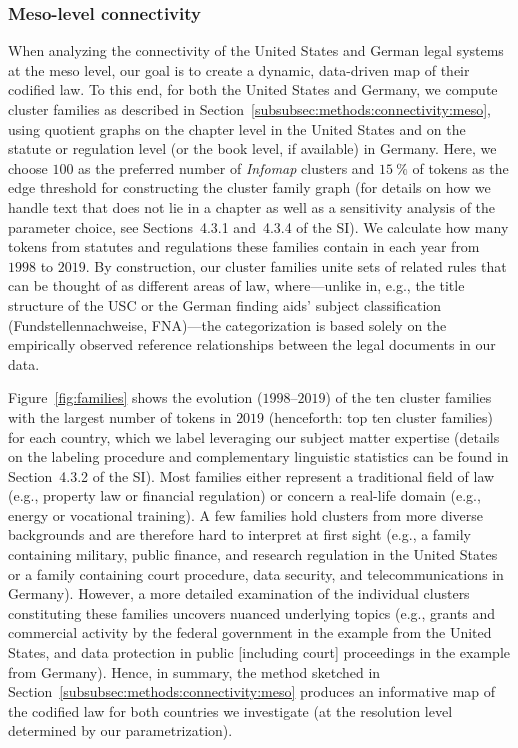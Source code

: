 \documentclass[utf8,sort&compress,table,hidelinks]{frontiersFPHY} %
\newcommand{\thesi}{SI\xspace}
\begin{document}
\vspace*{12pt}
\subsubsection{Meso-level connectivity}
\label{subsubsec:results:connectivity:meso}

When analyzing the connectivity of the United States and German legal systems at the meso level, our goal is to create a dynamic, data-driven map of their codified law.
To this end, for both the United States and Germany, we compute cluster families as described in Section~\ref{subsubsec:methods:connectivity:meso}, 
using quotient graphs on the chapter level in the United States and on the statute or regulation level (or the book level, if available) in Germany. 
Here, we choose $100$ as the preferred number of \emph{Infomap} clusters and $15~\%$ of tokens as the edge threshold for constructing the cluster family graph (for details on how we handle text that does not lie in a chapter as well as a sensitivity analysis of the parameter choice, see Sections~4.3.1 and~4.3.4 of the \thesi). 
We calculate how many tokens from statutes and regulations these families contain in each year from $1998$ to $2019$.
By construction, our cluster families unite sets of related rules that can be thought of as different areas of law, where---unlike in, e.g., the title structure of the USC or the German finding aids' subject classification (Fundstellennachweise, FNA)---the categorization is based solely on the empirically observed reference relationships between the legal documents in our data.

Figure~\ref{fig:families} shows the evolution ($1998$--$2019$) of the ten cluster families with the largest number of tokens in $2019$ (henceforth: top ten cluster families) for each country, which we label leveraging our subject matter expertise (details on the labeling procedure and complementary linguistic statistics can be found in Section~4.3.2 of the \thesi).
Most families either represent a traditional field of law (e.g., property law or financial regulation) or concern a real-life domain (e.g., energy or vocational training).
A few families hold clusters from more diverse backgrounds and are therefore hard to interpret at first sight (e.g., a family containing military, public finance, and research regulation in the United States or a family containing court procedure, data security, and telecommunications in Germany).
However, a more detailed examination of the individual clusters constituting these families uncovers nuanced underlying topics (e.g., grants and commercial activity by the federal government in the example from the United States, and data protection in public [including court] proceedings in the example from Germany).
Hence, in summary, the method sketched in Section~\ref{subsubsec:methods:connectivity:meso} produces an informative map of the codified law for both countries we investigate (at the resolution level determined by our parametrization).
\end{document}
